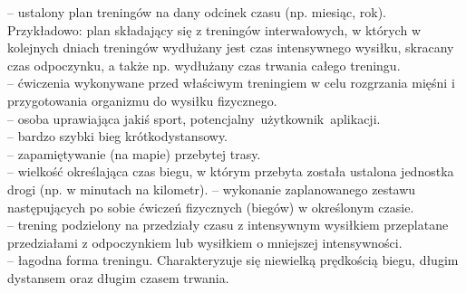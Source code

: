 \begin{multicols}{2}
\begin{description}
	-- ustalony plan treningów na dany odcinek czasu (np. miesiąc, rok). Przykładowo: plan składający się z treningów interwałowych, w których w kolejnych dniach treningów wydłużany jest czas intensywnego wysiłku, skracany czas odpoczynku, a także np. wydłużany czas trwania całego treningu.\\
	-- ćwiczenia wykonywane przed właściwym treningiem w celu rozgrzania mięśni i przygotowania organizmu do wysiłku fizycznego.\\
	-- osoba uprawiająca jakiś sport, \mbox{potencjalny użytkownik aplikacji.}\\
	-- bardzo szybki bieg krótkodystansowy.\\
	-- zapamiętywanie (na mapie) przebytej trasy.\\
	-- wielkość określająca czas biegu, w którym przebyta została ustalona jednostka drogi (np. w minutach na kilometr).
	-- wykonanie zaplanowanego zestawu następujących po sobie ćwiczeń fizycznych (biegów) w określonym czasie. \\
	-- trening podzielony na przedziały czasu z intensywnym wysiłkiem przeplatane przedziałami z odpoczynkiem lub wysiłkiem o mniejszej intensywności.\\
	-- łagodna for\-ma treningu. Charakteryzuje się niewielką prędkością biegu, długim dystansem oraz długim czasem trwania.\\
  \end{description}
\end{multicols}

